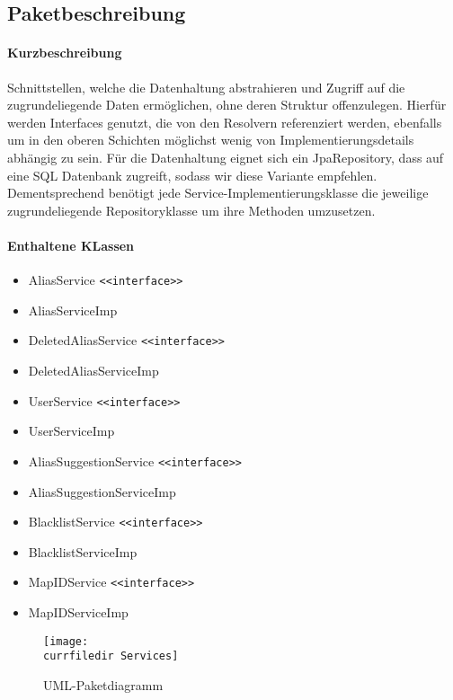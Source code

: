 \subsection*{Paketbeschreibung}%
\paragraph*{Kurzbeschreibung}
Schnittstellen, welche die Datenhaltung abstrahieren und Zugriff auf die zugrundeliegende Daten ermöglichen, ohne deren Struktur offenzulegen.
Hierfür werden Interfaces genutzt, die von den Resolvern referenziert werden, ebenfalls um in den oberen Schichten möglichst 
wenig von Implementierungsdetails abhängig zu sein. Für die Datenhaltung eignet sich ein JpaRepository, dass auf 
eine SQL Datenbank zugreift, sodass wir diese Variante empfehlen. Dementsprechend benötigt jede Service-Implementierungsklasse die jeweilige 
zugrundeliegende Repositoryklasse um ihre Methoden umzusetzen. 
\paragraph*{Enthaltene KLassen}
\begin{itemize}
    \item AliasService \texttt{<<interface>>}
    \item AliasServiceImp
    \item DeletedAliasService \texttt{<<interface>>}
    \item DeletedAliasServiceImp
    \item UserService \texttt{<<interface>>}
    \item UserServiceImp
    \item AliasSuggestionService \texttt{<<interface>>}
    \item AliasSuggestionServiceImp
    \item BlacklistService \texttt{<<interface>>}
    \item BlacklistServiceImp
    \item MapIDService \texttt{<<interface>>}
    \item MapIDServiceImp
\end{itemize}

\begin{figure}
    \centering
    \texttt{[image: \\currfiledir Services]}
    \caption{UML-Paketdiagramm}
\end{figure}

